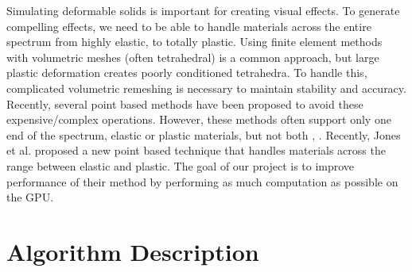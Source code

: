 \documentclass[cameraready]{acmsiggraph-awb}
\begin{document}
Simulating deformable solids is important for creating visual effects.  To generate compelling effects, we need to be able to handle materials across the entire spectrum from highly elastic, to totally plastic.  Using finite element methods with volumetric meshes (often tetrahedral) is a common approach, but large plastic deformation creates poorly conditioned tetrahedra.  To handle this, complicated volumetric remeshing is necessary to maintain stability and accuracy.  Recently, several point based methods have been proposed to avoid these expensive/complex operations.  However, these methods often support only one end of the spectrum, elastic or plastic materials, but not both  \cite{Mueller:2004:PBA}, \cite{Gerszewski:2009:APB}.  Recently, Jones et al. \cite{us} proposed a new point based technique that handles materials across the range between elastic and plastic.  The goal of our project is to improve performance of their method by performing as much computation as possible on the GPU.  

\section{Algorithm Description}
\end{document}
